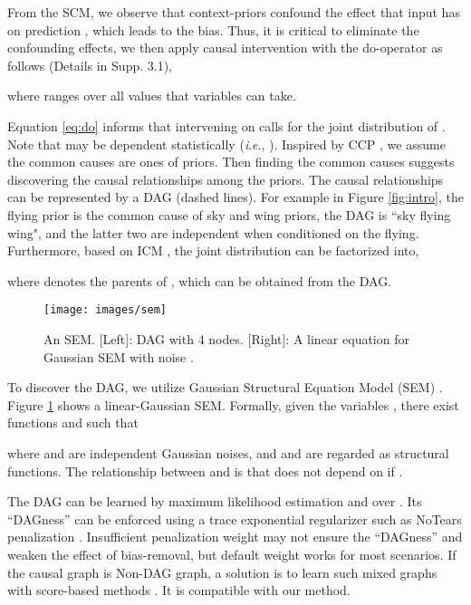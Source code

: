 \documentclass[letterpaper]{article} \usepackage{aaai23}  \usepackage{times}  \usepackage{helvet}  \usepackage{courier}  \usepackage[hyphens]{url}  \usepackage{graphicx} \urlstyle{rm} \def\UrlFont{\rm}  \usepackage{natbib}  \usepackage{caption} \frenchspacing  \setlength{\pdfpagewidth}{8.5in}  \setlength{\pdfpageheight}{11in}  \usepackage{algorithm}
\newcommand{\ie}{\textit{i}.\textit{e}.}
\theoremstyle{plain}
\theoremstyle{definition}
\theoremstyle{remark}
\begin{document}
From the SCM, we observe that context-priors  confound the effect  that input  has on prediction , which leads to the bias. Thus, it is critical to eliminate the confounding effects, we then apply causal intervention with the do-operator \cite{glymour2016causal} as follows (Details in Supp. 3.1), 

where  ranges over all values that variables  can take. 

Equation \ref{eq:do} informs that intervening on  calls for the joint distribution of . Note that  may be dependent statistically (\ie, ). Inspired by CCP \cite{scholkopfCausalRepresentationLearning2021}, we assume the common causes are ones of priors. Then finding the common causes suggests discovering the causal relationships among the priors. The causal relationships can be represented by a DAG (dashed lines). For example in Figure \ref{fig:intro}, the flying prior is the common cause of sky and wing priors, the DAG is ``sky  flying  wing", and the latter two are independent when conditioned on the flying. Furthermore, based on ICM \cite{scholkopfCausalRepresentationLearning2021}, the joint distribution  can be factorized into, 

where  denotes the parents of , which can be obtained from the DAG. 

\begin{figure}[t]
	\centering
	\texttt{[image: images/sem]}
\caption{An SEM. [Left]:  DAG with 4 nodes. [Right]: A linear equation for Gaussian SEM with noise . }
	\label{fig:sem}
\end{figure}	

To discover the DAG, we utilize Gaussian Structural Equation Model (SEM) \cite{pearl2000models}. Figure \ref{fig:sem} shows a linear-Gaussian SEM. Formally, given the variables , there exist functions  and  such that

where  and  are independent Gaussian noises, and  and  are regarded as structural functions.
The relationship between  and  is that  does not depend on  if . 

The DAG can be learned by maximum likelihood estimation  and  over . Its ``DAGness'' can be enforced using a trace exponential regularizer such as NoTears penalization \cite{Zheng2018dags}.
Insufficient penalization weight may not ensure the ``DAGness'' and weaken the effect of bias-removal, but default weight works for most scenarios. If the causal graph is Non-DAG graph, a solution is to learn such mixed graphs with score-based methods \cite{pmlr-v108-bernstein20a}. It is compatible with our method. 
\end{document}
